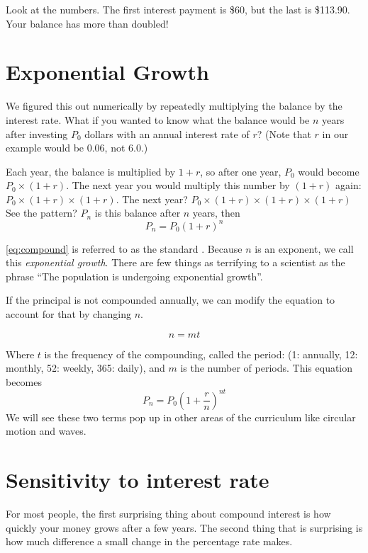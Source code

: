 Look at the numbers.  The first interest payment is \$60, but the last
is \$113.90. Your balance has more than doubled!

\section{Exponential Growth}

We figured this out numerically by repeatedly multiplying the balance
by the interest rate. What if you wanted to know what the balance
would be $n$ years after investing $P_0$ dollars with an annual interest
rate of $r$? (Note that $r$ in our example would be 0.06, not 6.0.)

Each year, the balance is multiplied by $1 + r$, so after one year,
$P_0$ would become $P_0 \times (1 + r)$.  The next year you would multiply
this number by $(1 + r)$ again: $P_0 \times (1 + r) \times (1 + r)$. The
next year? $P_0 \times (1 + r) \times (1 + r) \times (1 + r)$ See the
pattern? $P_n$ is this balance after $n$ years, then
\begin{equation}
  P_n = P_0 (1+r)^n
  \label{eq:compound}
\end{equation}

\ref{eq:compound} is referred to as the standard . 
Because $n$ is an exponent, we call this \textit{exponential growth}.
There are few things as terrifying to a scientist as
the phrase ``The population is undergoing exponential growth''.

If the principal is not compounded annually, we can modify the equation to account for that by changing $n$.

$$n = m t$$

Where $t$ is the frequency of the compounding, called the period: (1: annually, 12: monthly, 52: weekly, 365: daily), and $m$ is the number of periods. 
This equation becomes
$$P_n = P_0 (1+\frac{r}{n})^{nt}$$
We will see these two terms pop up in other areas of the curriculum like circular motion and waves.

\section{Sensitivity to interest rate}

For most people, the first surprising thing about compound interest is
how quickly your money grows after a few years.  The second thing that
is surprising is how much difference a small change in the percentage
rate makes.

